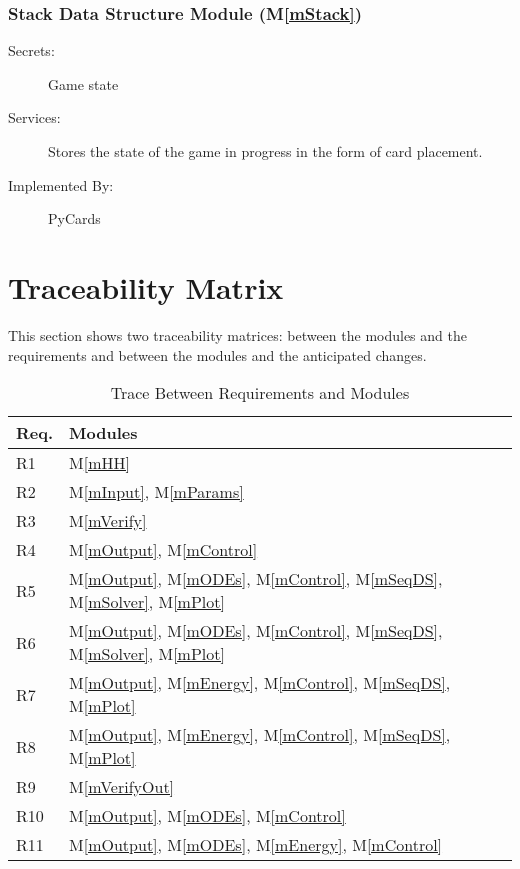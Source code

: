 \documentclass[12pt, titlepage]{article}
\newcommand{\mref}[1]{M\ref{#1}}
\begin{document}
	\subsubsection{Stack Data Structure Module (\mref{mStack})}
	\begin{description}
		\item[Secrets:]Game state
		\item[Services:]Stores the state of the game in progress in the form of 
		card placement.
		\item[Implemented By:] PyCards
	\end{description}
	
	
	
	\section{Traceability Matrix} \label{SecTM}
	This section shows two traceability matrices: between the modules and the
	requirements and between the modules and the anticipated changes.
	\begin{table}[H]
		\centering
		\begin{tabular}{p{} p{}}
			\toprule
			\textbf{Req.} & \textbf{Modules}\\
			\midrule
			R1 & \mref{mHH}\\
			R2 & \mref{mInput}, \mref{mParams}\\
			R3 & \mref{mVerify}\\
			R4 & \mref{mOutput}, \mref{mControl}\\
			R5 & \mref{mOutput}, \mref{mODEs}, \mref{mControl}, \mref{mSeqDS},  
			\mref{mSolver}, \mref{mPlot}\\
			R6 & \mref{mOutput}, \mref{mODEs}, \mref{mControl}, \mref{mSeqDS}, 
			\mref{mSolver}, \mref{mPlot}\\
			R7 & \mref{mOutput}, \mref{mEnergy}, \mref{mControl}, 
			\mref{mSeqDS}, \mref{mPlot}\\
			R8 & \mref{mOutput}, \mref{mEnergy}, \mref{mControl}, 
			\mref{mSeqDS}, \mref{mPlot}\\
			R9 & \mref{mVerifyOut}\\
			R10 & \mref{mOutput}, \mref{mODEs}, \mref{mControl}\\
			R11 & \mref{mOutput}, \mref{mODEs}, \mref{mEnergy}, 
			\mref{mControl}\\
			\bottomrule
		\end{tabular}
		\caption{Trace Between Requirements and Modules}
		\label{TblRT}
	\end{table}
\end{document}
